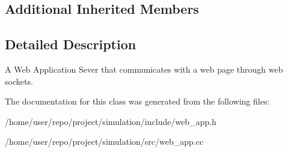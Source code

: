 \subsection*{Additional Inherited Members}


\subsection{Detailed Description}
A Web Application Sever that communicates with a web page through web sockets. 

The documentation for this class was generated from the following files\+:\begin{DoxyCompactItemize}
\item 
/home/user/repo/project/simulation/include/web\+\_\+app.\+h\item 
/home/user/repo/project/simulation/src/web\+\_\+app.\+cc\end{DoxyCompactItemize}
